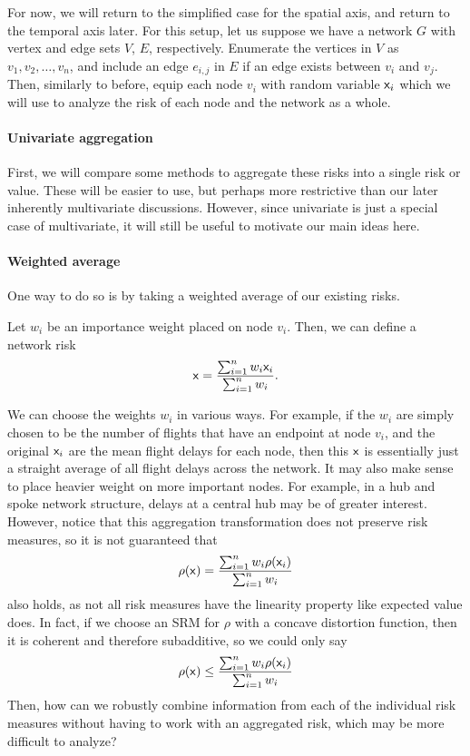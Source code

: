 For now, we will return to the simplified case for the spatial axis, and return to the temporal axis later. For this setup, let us suppose we have a network $G$ with vertex and edge sets $V$, $E$, respectively. Enumerate the vertices in $V$ as $v_1,v_2,\ldots,v_n$, and include an edge $e_{i,j}$ in $E$ if an edge exists between $v_i$ and $v_j$. Then, similarly to before, equip each node $v_i$ with random variable $\mathsf x_i$ which we will use to analyze the risk of each node and the network as a whole.

\paragraph{Univariate aggregation} First, we will compare some methods to aggregate these risks into a single risk or value. These will be easier to use, but perhaps more restrictive than our later inherently multivariate discussions. However, since univariate is just a special case of multivariate, it will still be useful to motivate our main ideas here.

\paragraph{Weighted average} One way to do so is by taking a weighted average of our existing risks.

\begin{example}
    Let $w_i$ be an importance weight placed on node $v_i$. Then, we can define a network risk
    \begin{equation}
        \mathsf x = \frac{\sum_{i=1}^n w_i \mathsf x_i} {\sum_{i=1}^n w_i}.
    \end{equation}
\end{example}

We can choose the weights $w_i$ in various ways. For example, if the $w_i$ are simply chosen to be the number of flights that have an endpoint at node $v_i$, and the original $\mathsf x_i$ are the mean flight delays for each node, then this $\mathsf x$ is essentially just a straight average of all flight delays across the network. It may also make sense to place heavier weight on more important nodes. For example, in a hub and spoke network structure, delays at a central hub may be of greater interest. However, notice that this aggregation transformation does not preserve risk measures, so it is not guaranteed that 
\begin{equation}
    \rs{\rx} = \frac{\sum_{i=1}^n w_i \rs{\rx_i}} {\sum_{i=1}^n w_i}
\end{equation}
also holds, as not all risk measures have the linearity property like expected value does. In fact, if we choose an SRM for $\rho$ with a concave distortion function, then it is coherent and therefore subadditive, so we could only say
\begin{equation}
    \rs{\rx} \le \frac{\sum_{i=1}^n w_i \rs{\rx_i}} {\sum_{i=1}^n w_i}
\end{equation}
Then, how can we robustly combine information from each of the individual risk measures without having to work with an aggregated risk, which may be more difficult to analyze?

